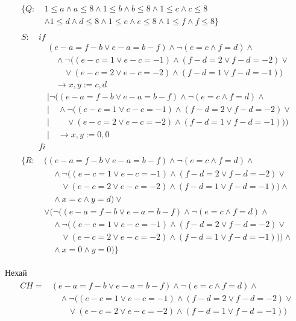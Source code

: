 \documentclass[14pt,a4paper]{extarticle}
\theoremstyle{definition}
\begin{document}
\begin{align*}
  \begin{split}
    \{Q:\ & 1 \leq a \land a \leq 8 \land 1 \leq b \land b \leq 8 \land 1 \leq c
    \land c \leq 8 \\& \land 1 \leq d \land d \leq 8
    \land 1 \leq e \land e \leq 8 \land 1 \leq f \land f \leq 8\}
  \end{split}\\
  \begin{split}
    S:\ & if\\
    &\quad(e-a=f-b \lor e-a=b-f) \land \lnot (e = c \land f = d) \land \\
    &\quad\quad\land\lnot ((e-c=1 \lor e-c=-1) \land (f-d=2 \lor f-d=-2) \lor \\
    &\quad\quad\quad\lor (e-c=2 \lor e-c=-2) \land (f-d=1 \lor f-d=-1)) \\
    &\quad\quad\to x,y := c, d \\
    &\quad|\lnot((e-a=f-b \lor e-a=b-f) \land \lnot (e = c \land f = d) \land \\
    &\quad|\quad\land\lnot ((e-c=1 \lor e-c=-1) \land (f-d=2 \lor f-d=-2) \lor \\
    &\quad|\quad\quad\lor (e-c=2 \lor e-c=-2) \land (f-d=1 \lor f-d=-1))) \\
    &\quad|\quad\to x,y := 0,0 \\
    &fi
  \end{split}\\
  \begin{split}
    \{R:\ & ((e-a=f-b \lor e-a=b-f) \land \lnot (e = c \land f = d) \land \\
    &\quad\land\lnot ((e-c=1 \lor e-c=-1) \land (f-d=2 \lor f-d=-2) \lor \\
    &\quad\quad\lor (e-c=2 \lor e-c=-2) \land (f-d=1 \lor f-d=-1)) \land \\
    &\quad\land x = c \land y = d) \lor \\
    &\lor(\lnot((e-a=f-b \lor e-a=b-f) \land \lnot (e = c \land f = d) \land \\
    &\quad\land\lnot ((e-c=1 \lor e-c=-1) \land (f-d=2 \lor f-d=-2) \lor \\
    &\quad\quad\lor (e-c=2 \lor e-c=-2) \land (f-d=1 \lor f-d=-1))) \land \\
    &\quad\land x = 0 \land y = 0)\}
  \end{split}
\end{align*}

Нехай
\begin{align*}
  \begin{split}
    CH =& (e-a=f-b \lor e-a=b-f) \land \lnot (e = c \land f = d) \land \\
    &\quad\land\lnot ((e-c=1 \lor e-c=-1) \land (f-d=2 \lor f-d=-2) \lor \\
    &\quad\quad\lor (e-c=2 \lor e-c=-2) \land (f-d=1 \lor f-d=-1))
  \end{split}
\end{align*}
\end{document}
